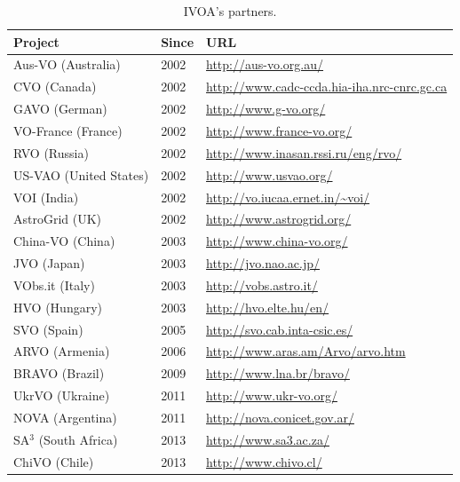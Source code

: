 \scriptsize
\begin{table}[h]
\centering
\begin{tabular}{|l|l|l|}
	\hline
	\textbf{Project} & \textbf{Since} & %
\textbf{URL} \\
	\hline
	Aus-VO (Australia) & 2002 & %
		\url{http://aus-vo.org.au/} \\
	\hline
   CVO (Canada) & 2002 & %
   	\url{http://www.cadc-ccda.hia-iha.nrc-cnrc.gc.ca} \\
	\hline
	GAVO (German) & 2002 & %
		\url{http://www.g-vo.org/} \\
	\hline
	VO-France (France) & 2002 & %
		\url{http://www.france-vo.org/} \\
	\hline
	RVO (Russia) & 2002 & %
		\url{http://www.inasan.rssi.ru/eng/rvo/} \\
	\hline
	US-VAO (United States) & 2002 & %
		 \url{http://www.usvao.org/} \\
	\hline
	VOI (India) & 2002 & %
		\url{http://vo.iucaa.ernet.in/~voi/} \\
	\hline
	AstroGrid (UK) & 2002 & %
		\url{http://www.astrogrid.org/} \\
	\hline
   China-VO (China) & 2003 & %
   \url{http://www.china-vo.org/} \\
	\hline
	JVO (Japan) & 2003 &%
		\url{http://jvo.nao.ac.jp/}\\
	\hline
	VObs.it (Italy) & 2003 & %
		\url{http://vobs.astro.it/} \\
	\hline
	HVO (Hungary) & 2003 & %
 		\url{http://hvo.elte.hu/en/} \\
	\hline
	SVO (Spain) & 2005 & %
		\url{http://svo.cab.inta-csic.es/} \\
	\hline
	ARVO (Armenia) & 2006 & %
		\url{http://www.aras.am/Arvo/arvo.htm} \\
	\hline
	BRAVO (Brazil) & 2009 & %
		\url{http://www.lna.br/bravo/} \\
	\hline
	UkrVO (Ukraine) & 2011 & %
		\url{http://www.ukr-vo.org/} \\
	\hline
	NOVA (Argentina) & 2011 & %
		\url{http://nova.conicet.gov.ar/} \\
	\hline
	SA$^3$ (South Africa) & 2013 & %
		\url{http://www.sa3.ac.za/} \\
	\hline
    ChiVO (Chile) & 2013 & %
		\url{http://www.chivo.cl/} \\
	\hline
\end{tabular}
\caption{IVOA's partners.}
\label{table:partners}
\end{table}
